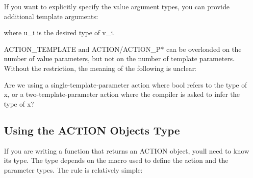 If you want to explicitly specify the value argument types, you can provide additional template arguments\+: 
\begin{DoxyCode}{0}
\end{DoxyCode}
 where {\ttfamily u\+\_\+i} is the desired type of {\ttfamily v\+\_\+i}.

{\ttfamily A\+C\+T\+I\+O\+N\+\_\+\+T\+E\+M\+P\+L\+A\+TE} and {\ttfamily A\+C\+T\+I\+ON}/{\ttfamily A\+C\+T\+I\+O\+N\+\_\+\+P$\ast$} can be overloaded on the number of value parameters, but not on the number of template parameters. Without the restriction, the meaning of the following is unclear\+:


\begin{DoxyCode}{0}
\end{DoxyCode}


Are we using a single-\/template-\/parameter action where {\ttfamily bool} refers to the type of {\ttfamily x}, or a two-\/template-\/parameter action where the compiler is asked to infer the type of {\ttfamily x}?

\subsection*{Using the A\+C\+T\+I\+ON Object\textquotesingle{}s Type}

If you are writing a function that returns an {\ttfamily A\+C\+T\+I\+ON} object, you\textquotesingle{}ll need to know its type. The type depends on the macro used to define the action and the parameter types. The rule is relatively simple\+:

